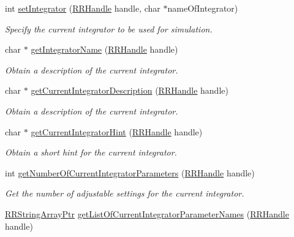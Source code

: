 \begin{DoxyCompactItemize}
int \hyperlink{group__simopts_gad6e463525042165dede8261851cc46af}{set\+Integrator} (\hyperlink{rrc__types_8h_a1d68f0592372208fa5a5f2799ea4b3ae}{R\+R\+Handle} handle, char $\ast$name\+Of\+Integrator)
\begin{DoxyCompactList}\small\item\em Specify the current integrator to be used for simulation. \end{DoxyCompactList}\item 
char $\ast$ \hyperlink{group__simopts_ga6bcd64ac9ce4a728b14a1fa570d6f5ae}{get\+Integrator\+Name} (\hyperlink{rrc__types_8h_a1d68f0592372208fa5a5f2799ea4b3ae}{R\+R\+Handle} handle)
\begin{DoxyCompactList}\small\item\em Obtain a description of the current integrator. \end{DoxyCompactList}\item 
char $\ast$ \hyperlink{group__simopts_ga4a917a0539977b7206d1bfbddcc98347}{get\+Current\+Integrator\+Description} (\hyperlink{rrc__types_8h_a1d68f0592372208fa5a5f2799ea4b3ae}{R\+R\+Handle} handle)
\begin{DoxyCompactList}\small\item\em Obtain a description of the current integrator. \end{DoxyCompactList}\item 
char $\ast$ \hyperlink{group__simopts_gadc3f18f7a683daa8848968ba54436f96}{get\+Current\+Integrator\+Hint} (\hyperlink{rrc__types_8h_a1d68f0592372208fa5a5f2799ea4b3ae}{R\+R\+Handle} handle)
\begin{DoxyCompactList}\small\item\em Obtain a short hint for the current integrator. \end{DoxyCompactList}\item 
int \hyperlink{group__simopts_ga7885d06904fc2cdceaa7e71448cde468}{get\+Number\+Of\+Current\+Integrator\+Parameters} (\hyperlink{rrc__types_8h_a1d68f0592372208fa5a5f2799ea4b3ae}{R\+R\+Handle} handle)
\begin{DoxyCompactList}\small\item\em Get the number of adjustable settings for the current integrator. \end{DoxyCompactList}\item 
\hyperlink{rrc__types_8h_a7c9475df6c7337d99482b13a365e7596}{R\+R\+String\+Array\+Ptr} \hyperlink{group__simopts_ga8bc1ea6950f141d40373416d64abaefa}{get\+List\+Of\+Current\+Integrator\+Parameter\+Names} (\hyperlink{rrc__types_8h_a1d68f0592372208fa5a5f2799ea4b3ae}{R\+R\+Handle} handle)

\end{DoxyCompactItemize}
